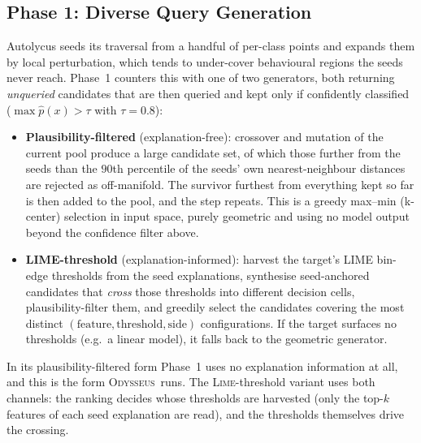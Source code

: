 \documentclass[sigconf,anonymous,review]{acmart}
\newcommand{\sys}{\textsc{Odysseus}}
\begin{document}
\subsection{Phase 1: Diverse Query Generation}
\label{subsec:diverse}
Autolycus seeds its traversal from a handful of per-class points and expands them by
local perturbation, which tends to under-cover behavioural regions the seeds never
reach. Phase~1 counters this with one of two generators, both returning \emph{unqueried}
candidates that are then queried and kept only if confidently classified
($\max \hat{p}(x) > \tau$ with $\tau = 0.8$):
\begin{itemize}
  \item \textbf{Plausibility-filtered} (explanation-free): crossover and mutation of the current
  pool produce a large candidate set, of which those further from the seeds than the $90$th
  percentile of the seeds' own nearest-neighbour distances are rejected as off-manifold. The
  survivor furthest from everything kept so far is then added to the pool, and the step repeats. This
  is a greedy max--min (k-center) selection in input space, purely geometric and using no model
  output beyond the confidence filter above.
  \item \textbf{LIME-threshold} (explanation-informed): harvest the target's LIME
  bin-edge thresholds from the seed explanations, synthesise
  seed-anchored candidates that \emph{cross} those thresholds into different decision
  cells, plausibility-filter them, and greedily select the candidates covering the most
  distinct $(\text{feature}, \text{threshold}, \text{side})$ configurations. If the
  target surfaces no thresholds (e.g.\ a linear model), it falls back to the geometric
  generator.
\end{itemize}
In its plausibility-filtered form Phase~1 uses no explanation information at all, and this is the
form \sys\ runs. The \textsc{Lime}-threshold variant uses both channels: the ranking decides whose
thresholds are harvested (only the top-$k$ features of each seed explanation are read), and the
thresholds themselves drive the crossing.
\end{document}
